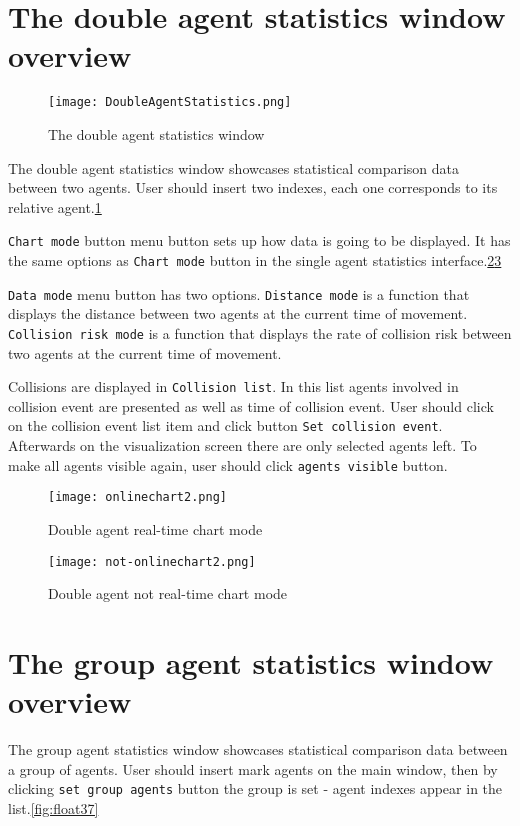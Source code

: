 \documentclass[thesis=B,english]{FITthesis}[2019/12/23]
\begin{document}
\section{The double agent statistics window overview}


\begin{figure}
	\texttt{[image: DoubleAgentStatistics.png]}
	\caption[Double Agent Statistics]{The double agent statistics window}\label{fig:float33}
\end{figure}

The double agent statistics window showcases statistical comparison data between two agents. User should insert two indexes, each one corresponds to its relative agent.\ref{fig:float33}

\verb|Chart mode| button menu button sets up how data is going to be displayed. It has the same options as \verb|Chart mode| button in the single agent statistics interface.\ref{fig:float34}\ref{fig:float35}

\verb|Data mode| menu button has two options. \verb|Distance mode| is a function that displays the distance between two agents at the current time of movement. \verb|Collision risk mode| is a function that displays the rate of collision risk between two agents at the current time of movement.

Collisions are displayed in \verb|Collision list|. In this list agents involved in collision event are presented as well as time of collision event. User should click on the collision event list item and click button \verb|Set collision event|. Afterwards on the visualization screen there are only selected agents left. To make all agents visible again, user should click \verb|agents visible| button.
\begin{figure}
	\texttt{[image: onlinechart2.png]}
	\caption[Online chart mode2]{Double agent real-time chart mode}\label{fig:float34}
\end{figure}

\begin{figure}
	\texttt{[image: not-onlinechart2.png]}
	\caption[Not Online chart mode2]{Double agent not real-time chart mode}\label{fig:float35}
\end{figure}

\section{The group agent statistics window overview}

The group agent statistics window showcases statistical comparison data between a group of agents. User should insert mark agents on the main window, then by clicking \verb|set group agents| button the group is set - agent indexes appear in the list.\ref{fig:float37}
\end{document}
